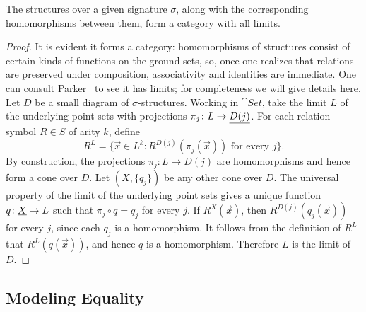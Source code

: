 
\begin{proposition}\label{prop: relational structures category}
    The structures over a given signature $\sigma$, along with the corresponding homomorphisms between them, form a category with all limits.
\end{proposition}
\begin{proof}
    It is evident it forms a category: homomorphisms of structures consist of certain kinds of functions on the ground sets, so, once one realizes that relations are preserved under composition, associativity and identities are immediate. One can consult Parker~\cite[Paragraph~3.10]{parker2022exponentiability} to see it has limits; for completeness we will give details here. Let $D$ be a small diagram of $\sigma$-structures. Working in $\cat{Set}$, take the limit $L$ of the underlying point sets with projections $\pi_j\colon L\to\underline{D(j)}$. For each relation symbol $R\in S$ of arity $k$, define
    \[
        R^L=\{\vec{x}\in L^k:R^{D(j)}(\pi_j(\vec{x}))\text{ for every }j\}.
    \]
    By construction, the projections $\pi_j:L\rightarrow D(j)$ are homomorphisms and hence form a cone over $D$. Let $(X,\{q_j\})$ be any other cone over $D$. The universal property of the limit of the underlying point sets gives a unique function $q\colon\underline{X}\rightarrow L$ such that $\pi_j\circ q=q_j$ for every $j$. If $R^X(\vec{x})$, then $R^{D(j)}(q_j(\vec{x}))$ for every $j$, since each $q_j$ is a homomorphism. It follows from the definition of $R^L$ that $R^L(q(\vec{x}))$, and hence $q$ is a homomorphism. Therefore $L$ is the limit of $D$.
\end{proof}

\subsection{Modeling Equality}
\label{subsec:model_eq}


